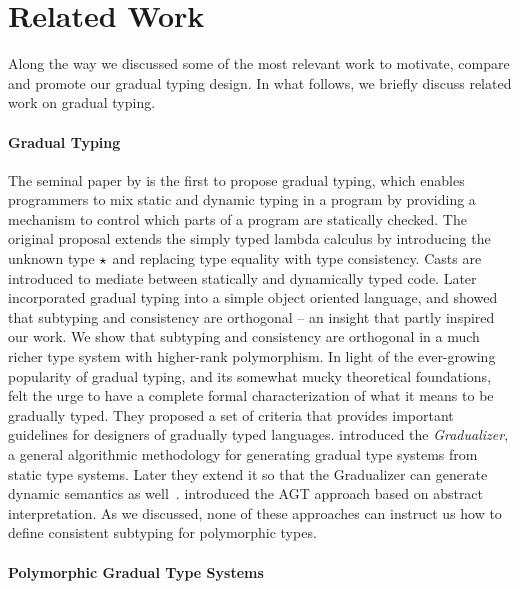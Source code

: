 
\section{Related Work}
\label{sec:related}

Along the way we discussed some of the most relevant work to motivate,
compare and
promote our gradual typing design. In what follows, we briefly discuss related
work on gradual typing.

\paragraph{Gradual Typing}

The seminal paper by \citet{siek2006gradual} is the first to propose gradual
typing, which enables programmers to mix static and dynamic typing in a program
by providing a mechanism to control which parts of a program are statically
checked. The original proposal extends the simply typed lambda calculus by
introducing the unknown type $\star$ and replacing type equality with type
consistency. Casts are introduced to mediate between statically and dynamically
typed code. Later \citet{siek2007gradual} incorporated gradual typing into a
simple object oriented language, and showed that subtyping and consistency are
orthogonal -- an insight that partly inspired our work. We show that subtyping
and consistency are orthogonal in a much richer type system with higher-rank
polymorphism. In light of the ever-growing popularity of gradual typing, and its
somewhat mucky theoretical foundations, \citet{siek2015refined} felt the urge to
have a complete formal characterization of what it means to be gradually typed.
They proposed a set of criteria that provides important guidelines for designers
of gradually typed languages. \citet{cimini2016gradualizer} introduced the
\textit{Gradualizer}, a general algorithmic methodology for generating gradual
type systems from static type systems. Later they extend it so that the
Gradualizer can generate dynamic semantics as well~\cite{CiminiPOPL}.
\citet{garcia2016abstracting} introduced the AGT approach based on abstract
interpretation. As we discussed, none of these approaches can instruct us how to
define consistent subtyping for polymorphic types.


\paragraph{Polymorphic Gradual Type Systems}

